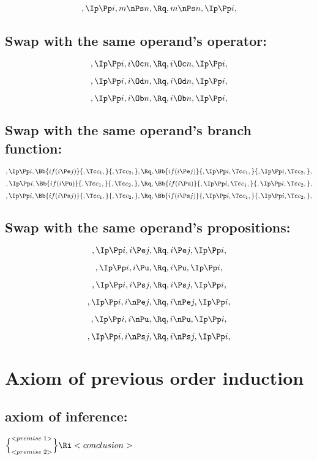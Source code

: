 \[,\Ip \Pp i, m \nPs n, \Rq , m \nPs n, \Ip \Pp i,\]


\bigskip
\bigskip
\subsection{Swap with the same operand's operator:}
\[,\Ip \Pp i, i \Oc n, \Rq , i \Oc n, \Ip \Pp i,\]

\[,\Ip \Pp i, i \Od n, \Rq , i \Od n, \Ip \Pp i,\]

\[,\Ip \Pp i, i \Ob n, \Rq , i \Ob n, \Ip \Pp i,\]


\bigskip
\bigskip
\subsection{Swap with the same operand's  branch function:}
\[,\Ip \Pp i, \Bb{if(i \Pe j)}{,\Tc c_1,}{,\Tc c_2,}, \Rq , \Bb{if(i \Pe j)}{,\Ip \Pp i, \Tc c_1,}{,\Ip \Pp i, \Tc c_2,},\]
\bigskip
\bigskip
\[,\Ip \Pp i, \Bb{if(i \Pu)}{,\Tc c_1,}{,\Tc c_2,}, \Rq , \Bb{if(i \Pu)}{,\Ip \Pp i, \Tc c_1,}{,\Ip \Pp i, \Tc c_2,},\]
\bigskip
\bigskip
\[,\Ip \Pp i, \Bb{if(i \Ps j)}{,\Tc c_1,}{,\Tc c_2,}, \Rq , \Bb{if(i \Ps j)}{,\Ip \Pp i, \Tc c_1,}{,\Ip \Pp i, \Tc c_2,},\]


\bigskip
\bigskip
\subsection{Swap with the same operand's propositions:}
\[,\Ip \Pp i, i \Pe j, \Rq , i \Pe j, \Ip \Pp i,\]

\[,\Ip \Pp i, i \Pu, \Rq , i \Pu, \Ip \Pp i,\]

\[,\Ip \Pp i, i \Ps j, \Rq , i \Ps j, \Ip \Pp i,\]

\[,\Ip \Pp i, i \nPe j, \Rq , i \nPe j, \Ip \Pp i,\]

\[,\Ip \Pp i, i \nPu, \Rq , i \nPu, \Ip \Pp i,\]

\[,\Ip \Pp i, i \nPs j, \Rq , i \nPs j, \Ip \Pp i,\]






\bigskip
\bigskip
\bigskip
\bigskip
\section{Axiom of previous order induction}
\subsection{axiom of inference:}
\begin{math}
\Bigl\{ ^{<premise \; 1>}_{<premise \;  2>}\Bigl\} \Ri <conclusion>
\end{math}
\bigskip
\bigskip
